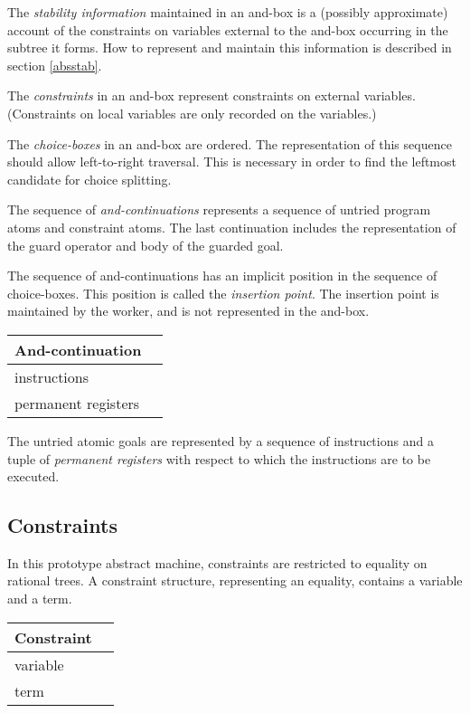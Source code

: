 The {\em stability information} maintained in an and-box
is a (possibly approximate) account of the constraints on variables
external to the and-box occurring in the subtree it forms.  How to
represent and maintain this information is described in section
\ref{absstab}.

The {\em constraints} in an and-box represent constraints on external
variables. (Constraints on local variables are only recorded on the
variables.)

The {\em choice-boxes} in an and-box are ordered. The representation
of this sequence should allow left-to-right traversal.  This is
necessary in order to find the leftmost candidate for choice
splitting.

The sequence of {\em and-continuations} represents a sequence of
untried program atoms and constraint atoms.
The last continuation includes the representation of
the guard operator and body of the guarded goal. 

The sequence of and-continuations has an implicit position in the
sequence of choice-boxes.  This position is called the {\em insertion
point}. The insertion point is maintained by the worker, and is not
represented in the and-box.

\medskip
\begin{center} \begin{tabular}{|l|l|} \hline
And-continuation \\
\hline
\hline
instructions\\
permanent registers \\
\hline
\end{tabular} \end{center}

The untried atomic goals are represented by a sequence of instructions
and a tuple of {\em permanent registers} with respect to which the
instructions are to be executed.


\subsection*{Constraints}

In this prototype abstract machine, constraints are restricted to
equality on rational trees.  A constraint structure, representing an
equality, contains a variable and a term.

\medskip
\begin{center} \begin{tabular}{|l|l|} \hline
Constraint \\
\hline
\hline
variable \\
term \\
\hline
\end{tabular} \end{center}


